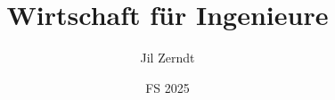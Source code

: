 \documentclass[a4paper, fontsize = 8pt, landscape]{scrartcl}
\title{Wirtschaft für Ingenieure}
\author{Jil Zerndt}
\date{FS 2025}
\begin{document}
\begin{multicols}{2}
	\thispagestyle{TitlePageStyle}
	\maketitle
	\sffamily
	
	\raggedcolumns
	\pagebreak
    
    \raggedcolumns
    \pagebreak
    
    \raggedcolumns
    \pagebreak
    
    \raggedcolumns
    \pagebreak
    
    \raggedcolumns
    \pagebreak
    
    \raggedcolumns
    \pagebreak
    
    \raggedcolumns
    \pagebreak
    
    \raggedcolumns
    \pagebreak
    
    \raggedcolumns
    \pagebreak
    
    \raggedcolumns
\end{multicols}
\end{document}
